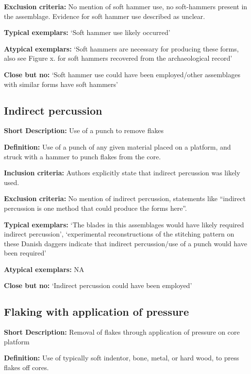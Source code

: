 \documentclass[
]{article}
\begin{document}
\textbf{Exclusion criteria:} No mention of soft hammer use, no
soft-hammers present in the assemblage. Evidence for soft hammer use
described as unclear.

\textbf{Typical exemplars:} `Soft hammer use likely occurred'

\textbf{Atypical exemplars:} `Soft hammers are necessary for producing
these forms, also see Figure x. for soft hammers recovered from the
archaeological record'

\textbf{Close but no:} `Soft hammer use could have been employed/other
assemblages with similar forms have soft hammers'

\hypertarget{indirect-percussion}{%
\subsection{Indirect percussion}\label{indirect-percussion}}

\textbf{Short Description:} Use of a punch to remove flakes

\textbf{Definition:} Use of a punch of any given material placed on a
platform, and struck with a hammer to punch flakes from the core.

\textbf{Inclusion criteria:} Authors explicitly state that indirect
percussion was likely used.

\textbf{Exclusion criteria:} No mention of indirect percussion,
statements like ``indirect percussion is one method that could produce
the forms here''.

\textbf{Typical exemplars:} `The blades in this assemblages would have
likely required indirect percussion', `experimental reconstructions of
the stitching pattern on these Danish daggers indicate that indirect
percussion/use of a punch would have been required'

\textbf{Atypical exemplars:} NA

\textbf{Close but no:} `Indirect percussion could have been employed'

\hypertarget{flaking-with-application-of-pressure}{%
\subsection{Flaking with application of
pressure}\label{flaking-with-application-of-pressure}}

\textbf{Short Description:} Removal of flakes through application of
pressure on core platform

\textbf{Definition:} Use of typically soft indentor, bone, metal, or
hard wood, to press flakes off cores.
\end{document}

